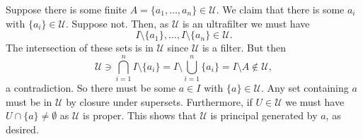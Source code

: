 \documentclass{article}
\theoremstyle{theorem}
\begin{document}
\begin{enumerate}[leftmargin=*]
\begin{enumerate}
			Suppose there is some finite $A= \{a_1,\ldots,a_n\}\in \mathcal{U}$. We claim that there is some $a_i$ with $\{a_i\}\in \mathcal{U}$. Suppose not. Then, as $\mathcal{U}$ is an ultrafilter we must have 
			\[
				I\setminus\{a_1\},\ldots,I\setminus \{a_n\}\in \mathcal{U}.
			\]
			The intersection of these sets is in $\mathcal{U}$ since $\mathcal{U}$ is a filter. But then
			\[
				\mathcal{U} \ni \bigcap_{i=1}^n I \setminus\{a_i\} = I\setminus \bigcup_{i=1}^n \{a_i\} = I\setminus A \notin \mathcal{U},
			\]
			a contradiction. So there must be some $a\in I$ with $\{a\}\in \mathcal{U}$. Any set containing $a$ must be in $\mathcal{U}$ by closure under supersets. Furthermore, if $U\in \mathcal{U}$ we must have $U\cap\{a\} \neq \emptyset$ as $\mathcal{U}$ is proper. This shows that $\mathcal{U}$ is principal generated by $a$, as desired.
			

\end{enumerate}
\end{enumerate}
\end{document}
